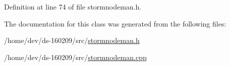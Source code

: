 Definition at line 74 of file stormnodeman.\+h.



The documentation for this class was generated from the following files\+:\begin{DoxyCompactItemize}
\item 
/home/dev/ds-\/160209/src/\hyperlink{stormnodeman_8h}{stormnodeman.\+h}\item 
/home/dev/ds-\/160209/src/\hyperlink{stormnodeman_8cpp}{stormnodeman.\+cpp}\end{DoxyCompactItemize}
